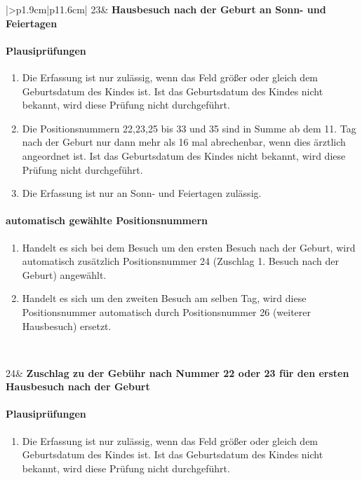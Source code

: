 \begin{mpsupertabular}{|>{\centering}p{1.9cm}|p{11.6cm}|}
23&
\textbf{Hausbesuch nach der Geburt an Sonn- und Feiertagen}
\paragraph{Plausiprüfungen}
\begin{enumerate}
\item
Die Erfassung ist nur zulässig, wenn das Feld  größer 
oder gleich dem Geburtsdatum des Kindes ist. Ist das Geburtsdatum des
Kindes nicht bekannt, wird diese Prüfung nicht durchgeführt.
\item
Die Positionsnummern 22,23,25 bis 33 und 35 sind in Summe ab dem 11. Tag 
nach der Geburt nur dann mehr 
als 16 mal abrechenbar, wenn dies ärztlich angeordnet ist.
 Ist das Geburtsdatum des
Kindes nicht bekannt, wird diese Prüfung nicht durchgeführt.
\item
Die Erfassung ist nur an Sonn- und Feiertagen zulässig.
\end{enumerate}
\paragraph{automatisch gewählte Positionsnummern}
\begin{enumerate}
\item
Handelt es sich bei dem Besuch um den ersten Besuch nach der Geburt,
wird automatisch zusätzlich Positionsnummer 24 (Zuschlag 1. Besuch 
nach der Geburt) angewählt. 
\item
Handelt es sich um den zweiten Besuch am selben Tag, wird diese 
Positionsnummer automatisch durch Positionsnummer 26 (weiterer Hausbesuch)
ersetzt.
\end{enumerate}
\\ \hline


24&
\textbf{Zuschlag zu der Gebühr nach Nummer 22 oder 23 für den
ersten Hausbesuch nach der Geburt}
\paragraph{Plausiprüfungen}
\begin{enumerate}
\item
Die Erfassung ist nur zulässig, wenn das Feld  größer 
oder gleich dem Geburtsdatum des Kindes ist. Ist das Geburtsdatum des
Kindes nicht bekannt, wird diese Prüfung nicht durchgeführt.
\end{enumerate}

\end{mpsupertabular}
